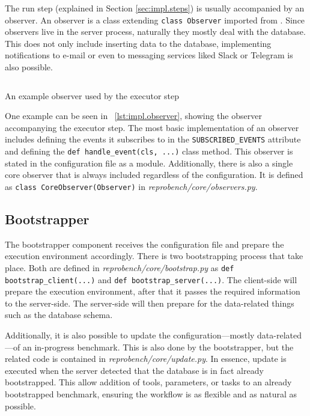 The run step (explained in Section \ref{sec:impl.steps}) is usually accompanied by an observer.
An observer is a class extending \texttt{class Observer} imported from .
Since observers live in the server process, naturally they mostly deal with the database.
This does not only include inserting data to the database, implementing notifications to e-mail or even to messaging services liked Slack or Telegram is also possible.

\begin{listing}
    \inputminted[firstline=7,lastline=13]{python}{assets/listings/reprobench/reprobench/executors/base.py}
    \caption{An example observer used by the executor step}
    \label{lst:impl.observer}
\end{listing}

One example can be seen in \lst~\ref{lst:impl.observer}, showing the observer accompanying the executor step.
The most basic implementation of an observer includes defining the events it subscribes to in the \texttt{SUBSCRIBED_EVENTS} attribute and defining the \texttt{def handle_event(cls, ...)} class method.
This observer is stated in the configuration file as a module.
Additionally, there is also a single core observer that is always included regardless of the configuration.
It is defined as \texttt{class CoreObserver(Observer)} in \emph{reprobench/core/observers.py}.

\subsection{Bootstrapper}

The bootstrapper component receives the configuration file and prepare the execution environment accordingly.
There is two bootstrapping process that take place.
Both are defined in \emph{reprobench/core/bootstrap.py} as \texttt{def bootstrap_client(...)} and \texttt{def bootstrap_server(...)}.
The client-side will prepare the execution environment, after that it passes the required information to the server-side.
The server-side will then prepare for the data-related things such as the database schema.

Additionally, it is also possible to update the configuration---mostly data-related---of an in-progress benchmark.
This is also done by the bootstrapper, but the related code is contained in \emph{reprobench/core/update.py}.
In essence, update is executed when the server detected that the database is in fact already bootstrapped.
This allow addition of tools, parameters, or tasks to an already bootstrapped benchmark, ensuring the workflow is as flexible and as natural as possible.

